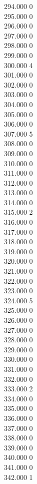 { 294.000	0 \\
 295.000	0 \\
 296.000	0 \\
 297.000	0 \\
 298.000	0 \\
 299.000	0 \\
 300.000	4 \\
 301.000	0 \\
 302.000	0 \\
 303.000	0 \\
 304.000	0 \\
 305.000	0 \\
 306.000	0 \\
 307.000	5 \\
 308.000	0 \\
 309.000	0 \\
 310.000	0 \\
 311.000	0 \\
 312.000	0 \\
 313.000	0 \\
 314.000	0 \\
 315.000	2 \\
 316.000	0 \\
 317.000	0 \\
 318.000	0 \\
 319.000	0 \\
 320.000	0 \\
 321.000	0 \\
 322.000	0 \\
 323.000	0 \\
 324.000	5 \\
 325.000	0 \\
 326.000	0 \\
 327.000	0 \\
 328.000	0 \\
 329.000	0 \\
 330.000	0 \\
 331.000	0 \\
 332.000	0 \\
 333.000	2 \\
 334.000	0 \\
 335.000	0 \\
 336.000	0 \\
 337.000	0 \\
 338.000	0 \\
 339.000	0 \\
 340.000	0 \\
 341.000	0 \\
 342.000	1 \\
}
